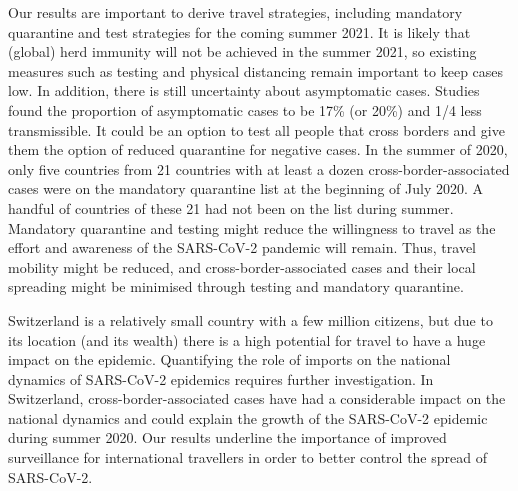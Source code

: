 \documentclass[10pt, a4paper, twoside]{article}
\begin{document}
\begin{multicols}{2}
Our results are important to derive travel strategies, including mandatory quarantine and test strategies for the coming summer 2021.
It is likely that (global) herd immunity will not be achieved in the summer 2021, so existing measures such as testing and physical distancing remain important to keep cases low.
In addition, there is still uncertainty about asymptomatic cases.\cite{nogrady_what_2020}
Studies found the proportion of asymptomatic cases to be 17\% (or 20\%) and 1/4 less transmissible.\cite{byambasuren_estimating_2020,buitrago-garcia_occurrence_2020,bi_household_2020}
It could be an option to test all people that cross borders and give them the option of reduced quarantine for negative cases.\cite{ashcroft_quantifying_2021}
In the summer of 2020, only five countries from 21 countries with at least a dozen cross-border-associated cases were on the mandatory quarantine list at the beginning of July 2020.
A handful of countries of these 21 had not been on the list during summer.
Mandatory quarantine and testing might reduce the willingness to travel as the effort and awareness of the SARS-CoV-2 pandemic will remain.
Thus, travel mobility might be reduced, and cross-border-associated cases and their local spreading might be minimised through testing and mandatory quarantine.

Switzerland is a relatively small country with a few million citizens, but due to its location (and its wealth) there is a high potential for travel to have a huge impact on the epidemic.
Quantifying the role of imports on the national dynamics of SARS-CoV-2 epidemics requires further investigation. 
In Switzerland, cross-border-associated cases have had a considerable impact on the national dynamics and could explain the growth of the SARS-CoV-2 epidemic during summer 2020. 
Our results underline the importance of improved surveillance for international travellers in order to better control the spread of SARS-CoV-2.


\end{multicols}
\end{document}
